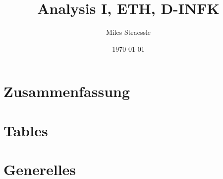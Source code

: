 \documentclass[11pt]{article}
\begin{document}
	
\setcounter{page}{1}
\setcounter{tocdepth}{2}

\title{Analysis I, ETH, D-INFK}
\author{Miles Straessle}
\date{\today}
\maketitle


% 



\part{Zusammenfassung}




%




\part{Tables}


%
%

\part{Generelles}



\end{document}
